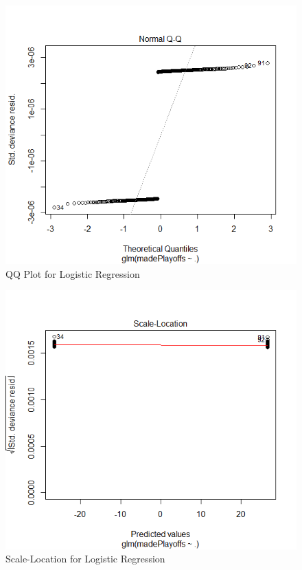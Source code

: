 \documentclass{beamer}
\begin{document}
\begin{frame}
	\begin{figure}
		\centering
		\includegraphics[width=0.7\linewidth]{Log2}
		\caption{QQ Plot for Logistic Regression}
		\label{fig:QQ Plot for R Squared}
	\end{figure}
\end{frame}
\begin{frame}
	\begin{figure}
		\centering
		\includegraphics[width=0.7\linewidth]{Log3}
		\caption{Scale-Location for Logistic Regression}
		\label{fig:Scale-Location for Logistic Regression}
	\end{figure}
\end{frame}
\end{document}
